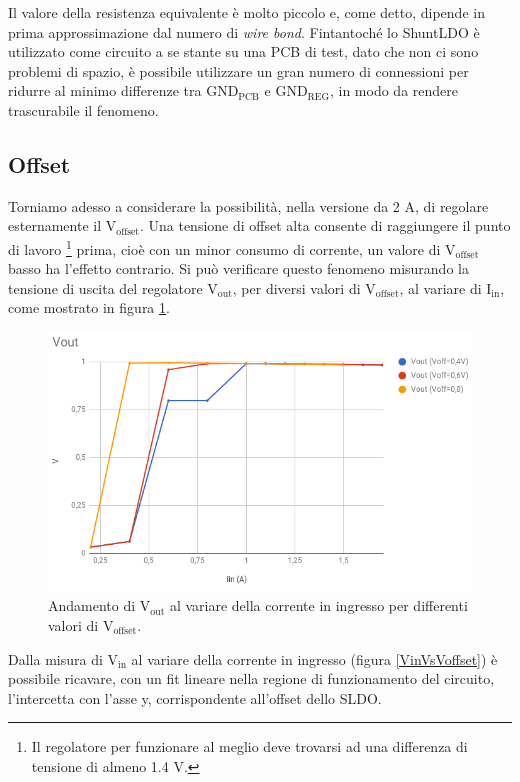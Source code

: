 Il valore della resistenza equivalente è molto piccolo e, come detto, dipende in prima approssimazione dal numero di \textit{wire bond}.
Fintantoché lo ShuntLDO è utilizzato come circuito a se stante su una PCB di test, dato che non ci sono problemi di spazio, è possibile utilizzare un gran numero di connessioni per ridurre al minimo differenze tra $\mathrm{GND_{PCB}}$ e $\mathrm{GND_{REG}}$, in modo da rendere trascurabile il fenomeno.

\subsection{Offset}

Torniamo adesso a considerare la possibilità, nella versione da 2 A, di regolare esternamente il $\mathrm{V_{offset}}$. 
Una tensione di offset alta consente di raggiungere il punto di lavoro
\footnote{
  Il regolatore per funzionare al meglio deve trovarsi ad una differenza di tensione di almeno 1.4 V.
}
prima, cioè con un minor consumo di corrente, un valore di $\mathrm{V_{offset}}$ basso ha l'effetto contrario.
Si può verificare questo fenomeno misurando la tensione di uscita del regolatore $\mathrm{V_{out}}$, per diversi valori di $\mathrm{V_{offset}}$, al variare di $\mathrm{I_{in}}$, come mostrato in figura \ref{VoutVsVoffset}.

\begin{figure}
\centering
\includegraphics[scale=.4]{Immagini/VoutVsVoffset}
\caption{Andamento di $\mathrm{V_{out}}$ al variare della corrente in ingresso per differenti valori di $\mathrm{V_{offset}}$.}
\label{VoutVsVoffset}
\end{figure}

Dalla misura di $\mathrm{V_{in}}$ al variare della corrente in ingresso (figura \ref{VinVsVoffset}) è possibile ricavare, con un fit lineare nella regione di funzionamento del circuito, l'intercetta con l'asse y, corrispondente all'offset dello SLDO. 

